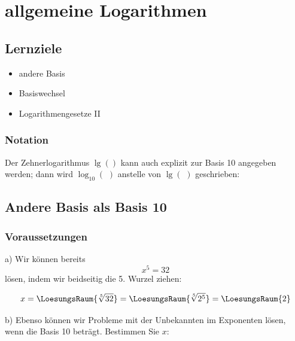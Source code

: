 
\section{allgemeine Logarithmen}
\subsection*{Lernziele}

\begin{itemize}
 \item andere Basis
 \item Basiswechsel
 \item Logarithmengesetze II
\end{itemize}



\subsubsection{Notation}
Der Zehnerlogarithmus $\lg()$ kann auch explizit zur Basis 10
angegeben werden; dann wird $\log_{10}(\,\,)$ anstelle von $\lg(\,\,)$ geschrieben:

\begin{center}
\end{center}


\newpage

\subsection{Andere Basis als Basis 10}

\subsubsection*{Voraussetzungen}

a) Wir können bereits $$x^5=32$$ lösen, indem wir beidseitig die
5. Wurzel ziehen:

$$x = \LoesungsRaum{\sqrt[5]{32}} = \LoesungsRaum{\sqrt[5]{2^5}} = \LoesungsRaum{2}$$

b) Ebenso können wir Probleme mit der Unbekannten im Exponenten lösen,
wenn die Basis 10 beträgt. Bestimmen Sie $x$:


